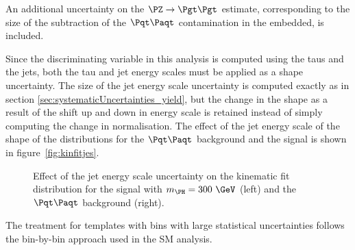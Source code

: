 An additional uncertainty on the $\ZToTauTau$ estimate, corresponding to the
size of the subtraction of the $\ttbar$ contamination in the embedded, is
included. 

Since the discriminating variable in this analysis is computed using the taus
and the jets, both the tau and jet energy scales must be applied as a shape
uncertainty. The size of the jet energy scale uncertainty is computed exactly as
in section \ref{sec:systematicUncertainties_yield}, but the change in the shape
as a result of the shift up and down in energy scale is retained instead of
simply computing the change in normalisation. The effect of the jet energy scale
of the shape of the distributions for the $\ttbar$ background and the signal is
shown in figure~\ref{fig:kinfitjes}.

\begin{figure}
\begin{center}

\end{center}
\caption{
Effect of the jet energy scale uncertainty on the kinematic fit distribution for
the signal with $m_{\PH}=300~\GeV$ (left) and the $\ttbar$ background (right).}
\label{fig:kinfitjet}
\end{figure} 

The treatment for templates with bins with large statistical uncertainties
follows the bin-by-bin approach used in the \ac{SM} analysis.

